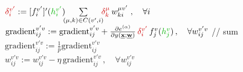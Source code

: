 \begin{frame}
{{				 {
					${\color{backward}\delta_i^{v'}} 
						:= [f_{i}^{v'}]'({\color{forward}h_i^{v'}}) 
						\kern-1ex\sum\limits_{(\mu,k) \in C(v',i)}\kern-1ex
						{\color{backward} \delta_k^{\mu}} 
						\, w_{ki}^{\mu v'} \;,
						\quad \forall i$
					\vspace{-2.5mm}
				}
				$\text{gradient}_{ij}^{v'v} := \text{gradient}_{ij}^{v'v}
						+ \frac{\partial e^{(\alpha)}}{\partial y(\vec x; \vec w)}
						 \, {\color{backward}\delta_i^{v'}} 
						 \, f_j^v({\color{forward}h_j^v})
						 \,, \quad \forall w_{ij}^{v'v}$
				\hspace{11mm} // sum
			}
			$\text{gradient}_{ij}^{v'v} := \frac{1}{p} \text{gradient}_{ij}^{v'v}$\\
			 $w_{ij}^{v'v} := w_{ij}^{v'v} - \eta
					\, \text{gradient}_{ij}^{v'v} 
					\,, \quad \forall w_{ij}^{v'v}	$
					\vspace{-1.5mm}
		}
\end{frame}


